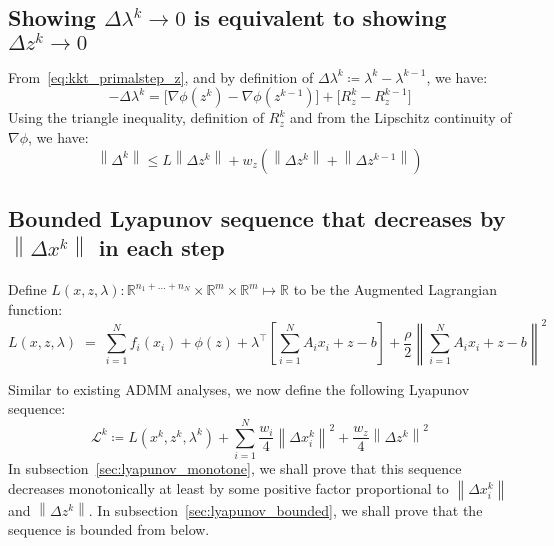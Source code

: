 \documentclass[11pt]{article}
\newcommand{\Image}[1]{\mathop{\text{Im}}\left(#1\right)}
\newcommand{\norm}[1]{\left\lVert #1 \right\rVert}
\begin{document}
\subsection{Showing $\Delta \lambda^k \to 0$ is equivalent to showing $\Delta z^k \to 0$}\label{sec:proof:lambda_to_x}
From~\eqref{eq:kkt_primalstep_z}, and by definition of $\Delta \lambda^k \coloneqq \lambda^k - \lambda^{k-1}$, we have:
\begin{equation*}
-\Delta \lambda^k =
\big[\nabla \phi(z^k) - \nabla \phi(z^{k-1})\big] + \big[R_z^k - R_z^{k-1}\big]
\end{equation*}
Using the triangle inequality, definition of $R_z^k$ and from the Lipschitz continuity of $\nabla \phi$, we have:
\begin{equation}\label{eq:delta_lambda}
\norm{\Delta^k} \leq L \norm{\Delta z^k} + w_z\left(\norm{\Delta z^k} + \norm{\Delta z^{k-1}}\right)
\end{equation}




\subsection{Bounded Lyapunov sequence that decreases by $\norm{\Delta x^k}$ in each step}\label{sec:proof:lyapunov}
Define $L(x, z, \lambda) : \mathbb{R}^{n_1 + \ldots + n_N} \times \mathbb{R}^m \times \mathbb{R}^m \mapsto \mathbb{R}$ to be the Augmented Lagrangian function:
\begin{equation}\label{eq:L_def}
L(x, z, \lambda)
\; = \;
\sum_{i = 1}^N f_i(x_i) + \phi(z) + \lambda^\top \left[ \sum_{i = 1}^N A_ix_i + z - b\right] + \frac{\rho}{2} \norm{\sum_{i=1}^N A_ix_i + z - b}^2
\end{equation}

Similar to existing ADMM analyses, we now define the following Lyapunov sequence:
\begin{equation}\label{eq:lyapunov_sequence_definition}
\mathcal{L}^k \coloneqq L(x^k, z^k, \lambda^k) + \sum_{i=1}^N \frac{w_i}{4} \norm{\Delta x_i^k}^2 + \frac{w_z}{4} \norm{\Delta z^k}^2
\end{equation}
In subsection~\ref{sec:lyapunov_monotone}, we shall prove that this sequence decreases monotonically at least by some positive factor proportional to $\norm{\Delta x_i^k}$ and $\norm{\Delta z^k}$.
In subsection~\ref{sec:lyapunov_bounded}, we shall prove that the sequence is bounded from below.
\end{document}
